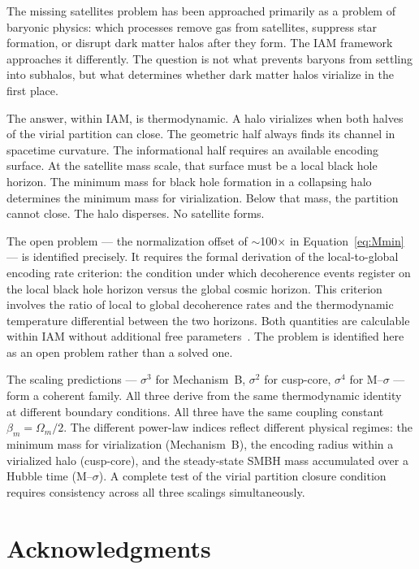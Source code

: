 \documentclass[12pt,a4paper]{article}
\begin{document}
The missing satellites problem has been approached primarily as a problem of
baryonic physics: which processes remove gas from satellites, suppress star
formation, or disrupt dark matter halos after they form. The IAM framework
approaches it differently. The question is not what prevents baryons from
settling into subhalos, but what determines whether dark matter halos
virialize in the first place.

The answer, within IAM, is thermodynamic. A halo virializes when both halves
of the virial partition can close. The geometric half always finds its channel
in spacetime curvature. The informational half requires an available encoding
surface. At the satellite mass scale, that surface must be a local black hole
horizon. The minimum mass for black hole formation in a collapsing halo
determines the minimum mass for virialization. Below that mass, the partition
cannot close. The halo disperses. No satellite forms.

The open problem --- the normalization offset of $\sim$100$\times$ in
Equation~\ref{eq:Mmin} --- is identified precisely. It requires the formal
derivation of the local-to-global encoding rate criterion: the condition under
which decoherence events register on the local black hole horizon versus the
global cosmic horizon. This criterion involves the ratio of local to global
decoherence rates and the thermodynamic temperature differential between the
two horizons. Both quantities are calculable within IAM without additional
free parameters~\citep{IAM_BH}. The problem is identified here as an open
problem rather than a solved one.

The scaling predictions --- $\sigma^3$ for Mechanism~B, $\sigma^2$ for
cusp-core, $\sigma^4$ for M--$\sigma$ --- form a coherent family. All three
derive from the same thermodynamic identity~\citep{IAM_thermo_virial} at different boundary conditions. All
three have the same coupling constant $\beta_m = \Omega_m/2$. The different
power-law indices reflect different physical regimes: the minimum mass for
virialization (Mechanism~B), the encoding radius within a virialized halo
(cusp-core), and the steady-state SMBH mass accumulated over a Hubble time
(M--$\sigma$). A complete test of the virial partition closure condition requires
consistency across all three scalings simultaneously.

\section*{Acknowledgments}
\end{document}
